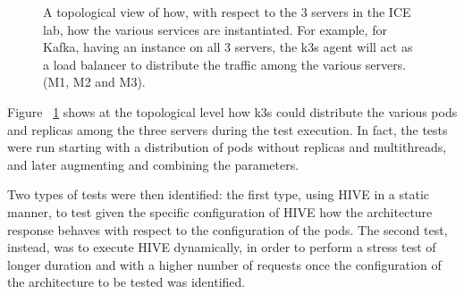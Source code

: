 \documentclass[]{IEEEtran}
\begin{document}
\begin{figure}


    \caption{A topological view of how, with respect to the 3 servers in the ICE lab, how the various services are instantiated. For example, for Kafka, having an instance on all 3 servers, the k3s agent will act as a load balancer to distribute the traffic among the various servers. (M1, M2 and M3).}
    \label{TopologyExample}
\end{figure}

    Figure ~\ref{TopologyExample} shows at the topological level how k3s could distribute the various pods and replicas among the three servers during the test execution.
In fact, the tests were run starting with a distribution of pods without replicas and multithreads, and later augmenting and combining the parameters.

Two types of tests were then identified: the first type, using HIVE in a static manner, to test given the specific configuration of HIVE how the architecture response behaves with respect to the configuration of the pods.
The second test, instead, was to execute HIVE dynamically, in order to perform a stress test of longer duration and with a higher number of requests once the configuration of the architecture to be tested was identified.
\end{document}

